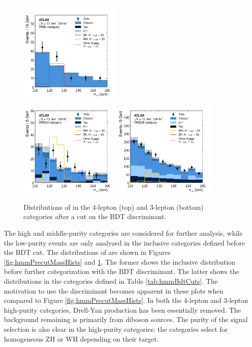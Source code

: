 \begin{figure}[htpb]
  \centering
  \includegraphics[width=0.45\textwidth]{figures/hmm/public/postCut/histo-4lep0-muu.pdf} \\
  \includegraphics[width=0.45\textwidth]{figures/hmm/public/postCut/histo-3lep0-muu.pdf} 
  \includegraphics[width=0.45\textwidth]{figures/hmm/public/postCut/histo-3lep1-muu.pdf} 
  \caption{Distributions of \muu in the 4-lepton (top) and 3-lepton (bottom) categories after a cut on the BDT discriminant.}
    \label{fig:hmmPostcutMassHists}
\end{figure}
\clearpage

The high and middle-purity categories are considered for further analysis, while the low-purity events are only analyzed in the inclusive categories defined before the BDT cut.
The distributions of \muu are shown in Figures \ref{fig:hmmPrecutMassHists} and \ref{fig:hmmPostcutMassHists}.
The former shows the inclusive distribution before further categorization with the BDT discriminant.
The latter shows the distributions in the categories defined in Table \ref{tab:hmmBdtCuts}.
The motivation to use the discriminant becomes apparent in these plots when compared to Figure \ref{fig:hmmPrecutMassHists}.
In both the 4-lepton and 3-lepton high-purity categories, Drell-Yan production has been essentially removed.
The background remaining is primarily from diboson sources.
The purity of the signal selection is also clear in the high-purity categories: the categories select for homogeneous ZH or WH depending on their target.

